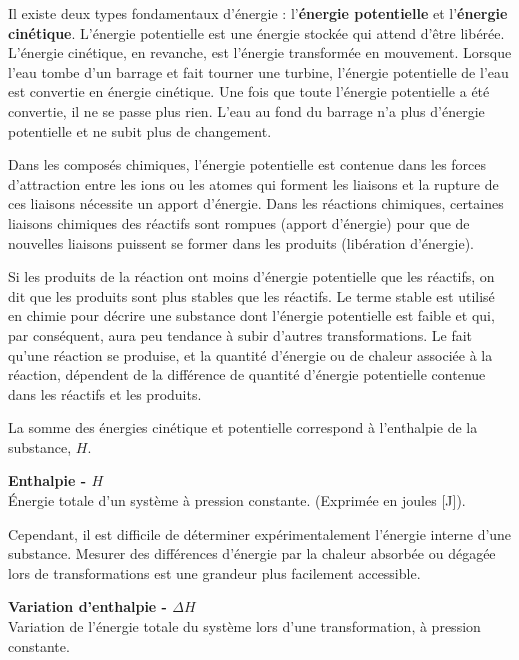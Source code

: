 \documentclass[
  11pt,
  french,
  a4paper,
  openany]{book}
\begin{document}
Il existe deux types fondamentaux d'énergie : l'\textbf{énergie potentielle} et l'\textbf{énergie cinétique}. L'énergie potentielle est une énergie stockée qui attend d'être libérée. L'énergie cinétique, en revanche, est l'énergie transformée en mouvement. Lorsque l'eau tombe d'un barrage et fait tourner une turbine, l'énergie potentielle de l'eau est convertie en énergie cinétique. Une fois que toute l'énergie potentielle a été convertie, il ne se passe plus rien. L'eau au fond du barrage n'a plus d'énergie potentielle et ne subit plus de changement.

Dans les composés chimiques, l'énergie potentielle est contenue dans les forces d'attraction entre les ions ou les atomes qui forment les liaisons et la rupture de ces liaisons nécessite un apport d'énergie. Dans les réactions chimiques, certaines liaisons chimiques des réactifs sont rompues (apport d'énergie) pour que de nouvelles liaisons puissent se former dans les produits (libération d'énergie).

Si les produits de la réaction ont moins d'énergie potentielle que les réactifs, on dit que les produits sont plus stables que les réactifs. Le terme stable est utilisé en chimie pour décrire une substance dont l'énergie potentielle est faible et qui, par conséquent, aura peu tendance à subir d'autres transformations. Le fait qu'une réaction se produise, et la quantité d'énergie ou de chaleur associée à la réaction, dépendent de la différence de quantité d'énergie potentielle contenue dans les réactifs et les produits.

La somme des énergies cinétique et potentielle correspond à l'enthalpie de la substance, \(H\).

\begin{tcolorbox}
\textbf{Enthalpie - \(H\)}\\
Énergie totale d'un système à pression constante. (Exprimée en joules {[}J{]}).

\end{tcolorbox}

Cependant, il est difficile de déterminer expérimentalement l'énergie interne d'une substance. Mesurer des différences d'énergie par la chaleur absorbée ou dégagée lors de transformations est une grandeur plus facilement accessible.

\begin{tcolorbox}
\textbf{Variation d'enthalpie - \(\Delta H\)}\\
Variation de l'énergie totale du système lors d'une transformation, à pression constante.

\end{tcolorbox}
\end{document}
